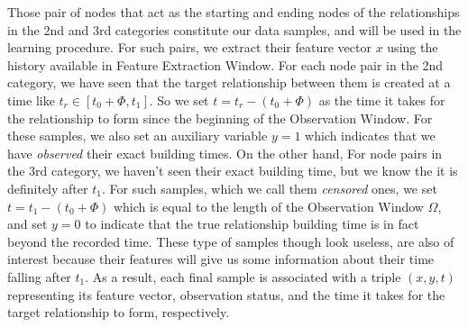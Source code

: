 Those pair of nodes that act as the starting and ending nodes of the relationships in the 2nd and 3rd categories constitute our data samples, and will be used in the learning procedure. For such pairs, we extract their feature vector $x$ using the history available in Feature Extraction Window. For each node pair in the 2nd category, we have seen that the target relationship between them is created at a time like $t_r\in[t_0+\Phi,t_1]$. So we set $t=t_r-(t_0+\Phi)$ as the time it takes for the relationship to form since the beginning of the Observation Window. For these samples, we also set an auxiliary variable $y=1$ which indicates that we have \emph{observed} their exact building times. On the other hand, For node pairs in the 3rd category, we haven't seen their exact building time, but we know the it is definitely after $t_1$. For such samples, which we call them \emph{censored} ones, we set $t=t_1-(t_0+\Phi)$ which is equal to the length of the Observation Window $\Omega$, and set $y=0$ to indicate that the true relationship building time is in fact beyond the recorded time. These type of samples though look useless, are also of interest because their features will give us some information about their time falling after $t_1$. As a result, each final sample is associated with a triple $(x,y,t)$ representing its feature vector, observation status, and the time it takes for the target relationship to form, respectively.



